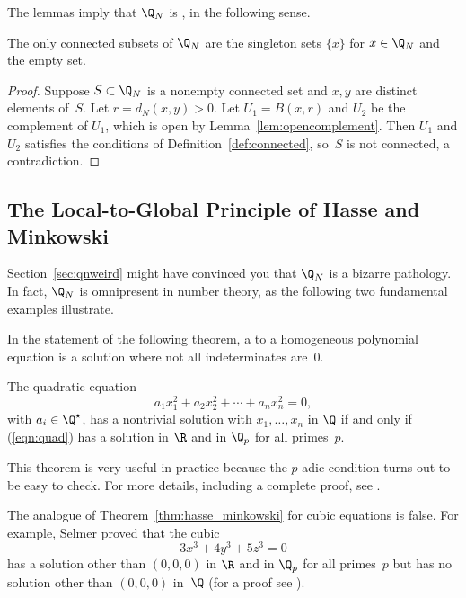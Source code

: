 \documentclass[11pt]{book}
\begin{document}
\begin{ch}
The lemmas imply that $\Q_N$ is ,
in the following sense.
\begin{proposition}\label{prop:disconnected}
The only connected subsets of $\Q_N$ are the singleton sets
$\{x\}$ for $x\in\Q_N$ and the empty set.
\end{proposition}
\begin{proof}
Suppose $S\subset \Q_N$ is a nonempty connected set and $x, y$ are distinct
elements of~$S$.  Let $r=d_N(x,y)>0$.  Let $U_1=B(x,r)$ and $U_2$ be
the complement of $U_1$, which is open by Lemma~\ref{lem:opencomplement}.
Then $U_1$ and $U_2$ satisfies the conditions of Definition~\ref{def:connected},
so~$S$ is not connected, a contradiction.
\end{proof}


\subsection{The Local-to-Global Principle of Hasse and Minkowski}\label{sec:hasse}
Section~\ref{sec:qnweird} might have convinced you that $\Q_N$ is a
bizarre pathology.  In fact, $\Q_N$ is omnipresent in number theory,
as the following two fundamental examples illustrate.

In the statement of the following theorem, a 
to a homogeneous polynomial equation is a solution where not all
indeterminates are~$0$.
\begin{theorem}
\label{thm:hasse_minkowski}
The quadratic equation
\begin{equation}\label{eqn:quad}
a_1x_1^2 + a_2 x_2^2 + \cdots + a_n x_n^2 = 0,
\end{equation}
with $a_i\in\Q^{\star}$,
has a nontrivial solution with $x_1,\ldots, x_n$ in $\Q$ if and only
if  (\ref{eqn:quad}) has a solution in $\R$ and in $\Q_p$ for
all primes~$p$.
\end{theorem}
This theorem is very useful in practice because the
$p$-adic condition turns out to be easy to check.  For more details,
including a complete proof, see
\cite[IV.3.2]{serre:arithmetic}.

The analogue of Theorem~\ref{thm:hasse_minkowski}
for cubic equations is false.
For example, Selmer proved that the cubic
$$
 3x^3 + 4y^3 + 5z^3 = 0
$$
has a solution other than $(0,0,0)$ in $\R$ and in $\Q_p$ for all primes~$p$
but has no solution other than $(0,0,0)$ in~$\Q$ (for a proof
see \cite[\S 18]{cassels:lectures}).


\end{ch}
\end{document}
